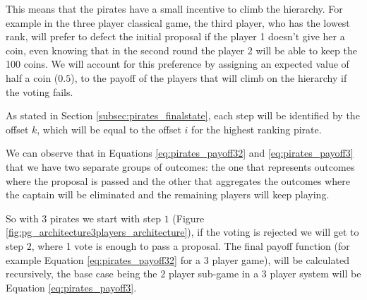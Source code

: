 This means that the pirates have a small incentive to climb the hierarchy. For example in the three player classical game, the third player, who has the lowest rank, will prefer to defect the initial proposal if the player 1 doesn't give her a coin, even knowing that in the second round the player 2 will be able to keep the 100 coins. We will account for this preference by assigning an expected value of half a coin ($0.5$), to the payoff of the players that will climb on the hierarchy if the voting fails.

As stated in Section \ref{subsec:pirates_finalstate}, each step will be identified by the offset $k$, which will be equal to the offset $i$ for the highest ranking pirate. 

We can observe that in Equations \ref{eq:pirates_payoff32} and \ref{eq:pirates_payoff3} that we have two separate groups of outcomes: the one that represents outcomes where the proposal is passed and the other that aggregates the outcomes where the captain will be eliminated and the remaining players will keep playing.

So with $3$ pirates we start with step $1$ (Figure \ref{fig:pg_architecture3players_architecture}), if the voting is rejected we will get to step $2$, where 1 vote is enough to pass a proposal. The final payoff function (for example Equation \ref{eq:pirates_payoff32} for a $3$ player game), will be calculated recursively, the base case being the $2$ player sub-game in a $3$ player system will be Equation \ref{eq:pirates_payoff3}.

 

